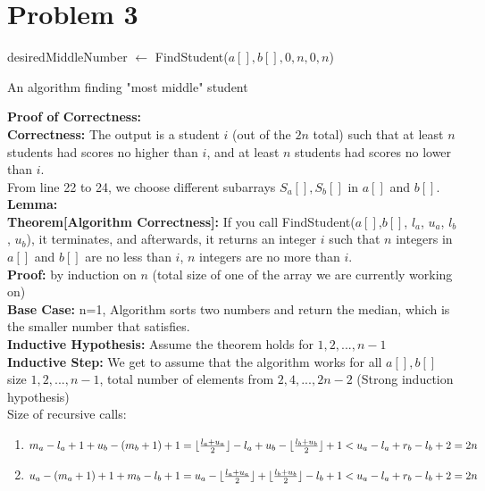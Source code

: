 \documentclass{article}
\begin{document}
\section{Problem 3}
\begin{algorithm}[!ht]
\DontPrintSemicolon
{}
    desiredMiddleNumber $\leftarrow$ FindStudent($a[],b[],0,n,0,n$)
      \;
\caption{An algorithm finding "most middle" student}
\end{algorithm}
\textbf{Proof of Correctness:}\\
\textbf{Correctness:} The output is a student $i$ (out
of the $2n$ total) such that at least $n$ students had scores no higher than $i$, and at least $n$ students had scores no
lower than $i$.\\
From line 22 to 24, we choose different subarrays $S_a[], S_b[]$ in $a[]$ and $b[]$.\\
\textbf{Lemma:} 
\\\textbf{Theorem[Algorithm Correctness]:} If you call FindStudent($a[ ]$,$b[]$, $l_a$, $u_a$, $l_b$, $u_b$), it terminates, and afterwards, it returns an integer $i$ such that $n$ integers in $a[]$ and $b[]$ are no less than $i$, $n$ integers are no more than $i$.\\
\textbf{Proof:} by induction on $n$ (total size of one of the array we are currently working on)
\\\textbf{Base Case:} n=1, Algorithm sorts two numbers and return the median, which is the smaller number that satisfies.
\\\textbf{Inductive Hypothesis:} Assume the theorem holds for $1,2,...,n-1$
\\\textbf{Inductive Step:} We get to assume that the algorithm works for all $a[],b[]$ size $1,2,...,n-1$, total number of elements from $2,4,...,2n-2$ (Strong induction hypothesis)
\\Size of recursive calls:
\begin{enumerate}
    \item $m_a-l_a+1+u_b-(m_b+1)+1\\= \lfloor\frac{l_a+u_a}{2}\rfloor-l_a+u_b-\lfloor\frac{l_b+u_b}{2}\rfloor+1 < u_a-l_a+r_b-l_b+2=2n$
    \item $u_a-(m_a+1)+1+m_b-l_b+1\\= u_a-\lfloor\frac{l_a+u_a}{2}\rfloor+\lfloor\frac{l_b+u_b}{2}\rfloor-l_b+1 < u_a-l_a+r_b-l_b+2=2n$
\end{enumerate}
\end{document}
